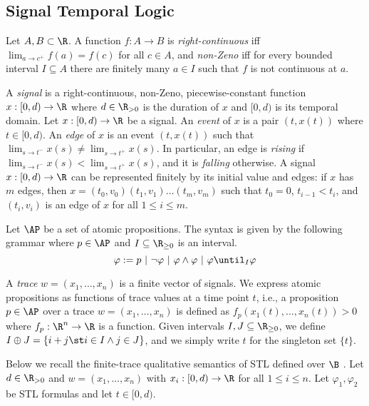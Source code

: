 \subsection{Signal Temporal Logic} \label{sec:stl}

Let $A,B \subset \R$.
%
A function $f : A \to B$ is
\emph{right-continuous} iff $\lim_{a \to c^+} f(a) = f(c)$ for all $c \in A$, and
\emph{non-Zeno} iff for every bounded interval $I \subseteq A$ there are finitely many $a \in I$ such that $f$ is not continuous at $a$.

A \emph{signal} is a right-continuous, non-Zeno, piecewise-constant function $x : [0,d) \to \R$ where $d \in \R_{> 0}$ is the duration of $x$ and $[0,d)$ is its temporal domain.
Let $x : [0,d) \to \R$ be a signal.
An \emph{event} of $x$ is a pair $(t, x(t))$ where $t \in [0,d)$.
An \emph{edge} of $x$ is an event $(t, x(t))$ such that $\lim_{s \to t^-} x(s) \neq \lim_{s \to t^+} x(s)$.
In particular, an edge is \emph{rising} if $\lim_{s \to t^-} x(s) < \lim_{s \to t^+} x(s)$, and it is \emph{falling} otherwise.
A signal $x : [0,d) \to \R$ can be represented finitely by its initial value and edges: if $x$ has $m$ edges, then $x = (t_0, v_0) (t_1, v_1) \ldots (t_m, v_m)$ such that $t_0 = 0$, $t_{i-1} < t_i$, and $(t_i, v_i)$ is an edge of $x$ for all $1 \leq i \leq m$.

Let $\AP$ be a set of atomic propositions.
The syntax is given by the following grammar where $p \in \AP$ and $I \subseteq \R_{\geq 0}$ is an interval.
$$ \varphi :=  p ~|~ \lnot \varphi ~|~ \varphi \land \varphi ~|~ \varphi \until_I \varphi$$

A \emph{trace} $w = (x_1, \ldots, x_n)$ is a finite vector of signals.
We express atomic propositions as functions of trace values at a time point $t$,
i.e., a proposition $p \in \AP$ over a trace $w = (x_1, \ldots, x_n)$ is defined as $f_p(x_1(t), \ldots, x_n(t)) > 0$ where $f_p : \R^n \to \R$ is a function.
Given intervals $I,J \subseteq \R_{\geq 0}$, we define $I \oplus J = \{i + j \st i \in I \land j \in J\}$, and we simply write $t$ for the singleton set $\{t\}$. 

Below we recall the finite-trace qualitative semantics of STL defined over $\B$ \cite{MalerN13}.
Let $d \in \R_{> 0}$ and $w = (x_1, \ldots, x_n)$ with $x_i : [0,d) \to \R$ for all $1 \leq i \leq n$.
Let $\varphi_1, \varphi_2$ be STL formulas and let $t \in [0,d)$.

